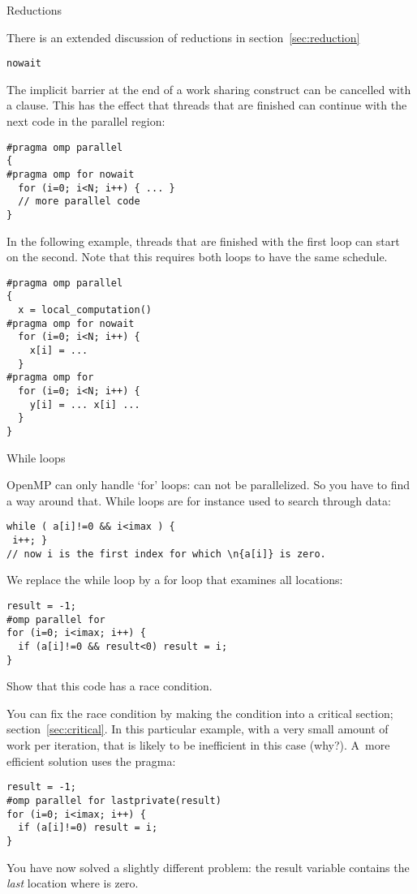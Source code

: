  {Reductions}

There is an extended discussion of reductions in section~\ref{sec:reduction}

 {\texttt{nowait}}

The implicit barrier at the end of a work sharing construct
can be cancelled with a  clause.
This has the effect that threads that are finished can continue
with the next code in the parallel region:
\begin{verbatim}
#pragma omp parallel
{
#pragma omp for nowait
  for (i=0; i<N; i++) { ... }
  // more parallel code
}
\end{verbatim}

In the following example, threads that are finished with the first loop
can start on the second. Note that this requires both loops to have
the same schedule.
\begin{verbatim}
#pragma omp parallel
{
  x = local_computation()
#pragma omp for nowait
  for (i=0; i<N; i++) { 
    x[i] = ... 
  }
#pragma omp for 
  for (i=0; i<N; i++) { 
    y[i] = ... x[i] ...
  }
}
\end{verbatim}

 {While loops}

OpenMP can only handle `for' loops:  can not
be parallelized. So you have to find a way around that. While loops
are for instance used to search through data:
\begin{verbatim}
while ( a[i]!=0 && i<imax ) {
 i++; }
// now i is the first index for which \n{a[i]} is zero.
\end{verbatim}
We replace the while loop by a for loop that examines all locations:
\begin{verbatim}
result = -1;
#omp parallel for
for (i=0; i<imax; i++) {
  if (a[i]!=0 && result<0) result = i;
}
\end{verbatim}
\begin{exercise}
  Show that this code has a race condition.
\end{exercise}
You can fix the race condition by making the condition into a critical section;
section~\ref{sec:critical}. In this particular example, with a very small amount
of work per iteration, that is likely to be inefficient 
in this case (why?).
A~more efficient solution uses the  pragma:
\begin{verbatim}
result = -1;
#omp parallel for lastprivate(result)
for (i=0; i<imax; i++) {
  if (a[i]!=0) result = i;
}
\end{verbatim}
You have now solved a slightly different problem: the result variable
contains the \emph{last} location where  is zero.

